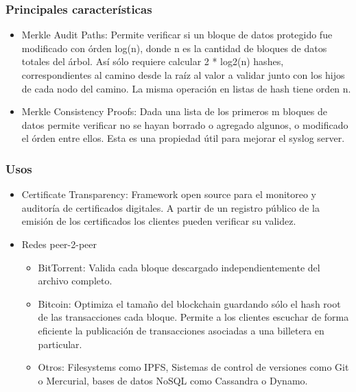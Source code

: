 \documentclass[10pt, a4paper,english,spanish]{beamer}
\begin{document}
\begin{frame}
\frametitle{Principales caracter\'isticas}

\begin{itemize}

\item Merkle Audit Paths: Permite verificar si un bloque de datos protegido fue modificado con \'orden log(n), donde n es la cantidad de bloques de datos totales del \'arbol. As\'i s\'olo requiere calcular 2 * log2(n) hashes, correspondientes al camino desde la ra\'iz al valor a validar junto con los hijos de cada nodo del camino. La misma operaci\'on en listas de hash tiene orden n.

\item Merkle Consistency Proofs: Dada una lista de los primeros m bloques de datos permite verificar no se hayan borrado o agregado algunos, o modificado el \'orden entre ellos. Esta es una propiedad \'util para mejorar el syslog server.

\end{itemize}

\end{frame}




\begin{frame}
\frametitle{Usos}

\begin{itemize}

\item Certificate Transparency: Framework open source para el monitoreo y auditor\'ia de certificados digitales. A partir de un registro p\'ublico de la emisi\'on de los certificados los clientes pueden verificar su validez.


\item Redes peer-2-peer
\begin{itemize}

\item BitTorrent: Valida cada bloque descargado independientemente del archivo completo.
\item Bitcoin: Optimiza el tama\~no del blockchain guardando s\'olo el hash root de las transacciones cada bloque. Permite a los clientes escuchar de forma eficiente la publicaci\'on de transacciones asociadas a una billetera en particular.
\item Otros: Filesystems como IPFS, Sistemas de control de versiones como Git o Mercurial, bases de datos NoSQL como Cassandra o Dynamo.


\end{itemize}

\end{itemize}


\end{frame}
\end{document}
